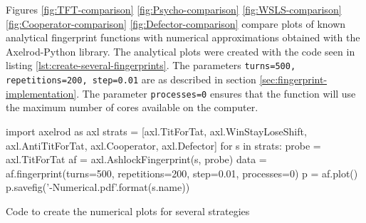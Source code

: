 Figures \ref{fig:TFT-comparison} \ref{fig:Psycho-comparison} \ref{fig:WSLS-comparison} \ref{fig:Cooperator-comparison} \ref{fig:Defector-comparison} compare plots of known analytical fingerprint functions with numerical approximations obtained with the Axelrod-Python library.
The analytical plots were created with the code seen in listing \ref{lst:create-several-fingerprints}.
The parameters \texttt{turns=500, repetitions=200, step=0.01} are as described in section \ref{sec:fingerprint-implementation}.
The parameter \texttt{processes=0} ensures that the function will use the maximum number of cores available on the computer.

\begin{listing}[hbtp!]
\begin{ExampleCode}
import axelrod as axl
strats = [axl.TitForTat, axl.WinStayLoseShift, axl.AntiTitForTat,
          axl.Cooperator, axl.Defector]
for s in strats:
    probe = axl.TitForTat
    af = axl.AshlockFingerprint(s, probe)
    data = af.fingerprint(turns=500, repetitions=200, step=0.01, processes=0)
    p = af.plot()
    p.savefig('{}-Numerical.pdf'.format(s.name))
\end{ExampleCode}
\caption{Code to create the numerical plots for several strategies}
\label{lst:create-several-fingerprints}
\end{listing}

